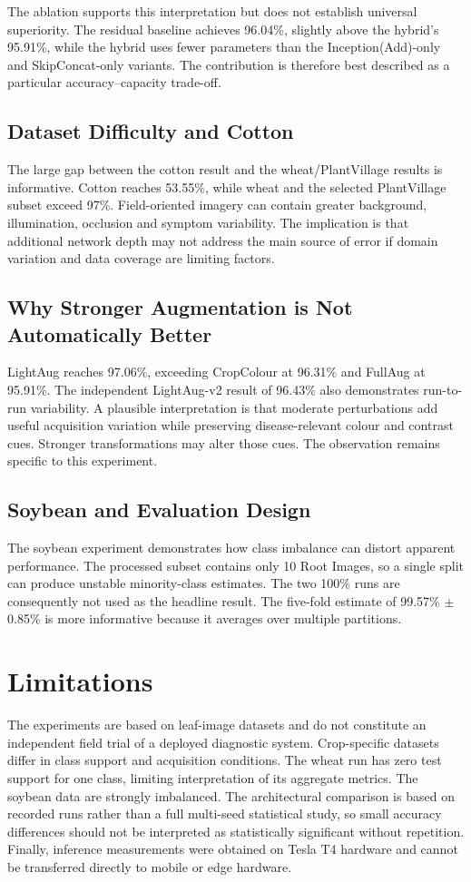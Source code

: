 \documentclass[a4paper,fleqn]{cas-dc}
\begin{document}
The ablation supports this interpretation but does not establish universal superiority. The residual baseline achieves 96.04\%, slightly above the hybrid's 95.91\%, while the hybrid uses fewer parameters than the Inception(Add)-only and SkipConcat-only variants. The contribution is therefore best described as a particular accuracy--capacity trade-off.

\subsection{Dataset Difficulty and Cotton}
The large gap between the cotton result and the wheat/PlantVillage results is informative. Cotton reaches 53.55\%, while wheat and the selected PlantVillage subset exceed 97\%. Field-oriented imagery can contain greater background, illumination, occlusion and symptom variability. The implication is that additional network depth may not address the main source of error if domain variation and data coverage are limiting factors.

\subsection{Why Stronger Augmentation is Not Automatically Better}
LightAug reaches 97.06\%, exceeding CropColour at 96.31\% and FullAug at 95.91\%. The independent LightAug-v2 result of 96.43\% also demonstrates run-to-run variability. A plausible interpretation is that moderate perturbations add useful acquisition variation while preserving disease-relevant colour and contrast cues. Stronger transformations may alter those cues. The observation remains specific to this experiment.

\subsection{Soybean and Evaluation Design}
The soybean experiment demonstrates how class imbalance can distort apparent performance. The processed subset contains only 10 Root Images, so a single split can produce unstable minority-class estimates. The two 100\% runs are consequently not used as the headline result. The five-fold estimate of 99.57\% $\pm$ 0.85\% is more informative because it averages over multiple partitions.

\section{Limitations}
The experiments are based on leaf-image datasets and do not constitute an independent field trial of a deployed diagnostic system. Crop-specific datasets differ in class support and acquisition conditions. The wheat run has zero test support for one class, limiting interpretation of its aggregate metrics. The soybean data are strongly imbalanced. The architectural comparison is based on recorded runs rather than a full multi-seed statistical study, so small accuracy differences should not be interpreted as statistically significant without repetition. Finally, inference measurements were obtained on Tesla T4 hardware and cannot be transferred directly to mobile or edge hardware.
\end{document}
